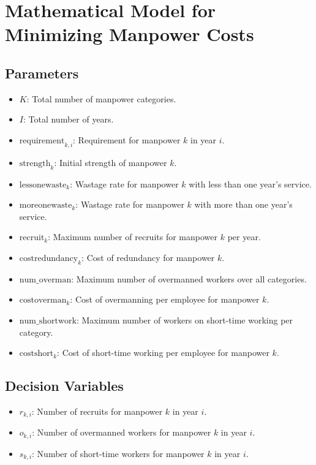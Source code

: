 \documentclass{article}
\begin{document}
\section*{Mathematical Model for Minimizing Manpower Costs}

\subsection*{Parameters}
\begin{itemize}
    \item $K$: Total number of manpower categories.
    \item $I$: Total number of years.
    \item $\text{requirement}_{k, i}$: Requirement for manpower $k$ in year $i$.
    \item $\text{strength}_{k}$: Initial strength of manpower $k$.
    \item $\text{lessonewaste}_{k}$: Wastage rate for manpower $k$ with less than one year's service.
    \item $\text{moreonewaste}_{k}$: Wastage rate for manpower $k$ with more than one year's service.
    \item $\text{recruit}_{k}$: Maximum number of recruits for manpower $k$ per year.
    \item $\text{costredundancy}_{k}$: Cost of redundancy for manpower $k$.
    \item $\text{num\_overman}$: Maximum number of overmanned workers over all categories.
    \item $\text{costoverman}_{k}$: Cost of overmanning per employee for manpower $k$.
    \item $\text{num\_shortwork}$: Maximum number of workers on short-time working per category.
    \item $\text{costshort}_{k}$: Cost of short-time working per employee for manpower $k$.
\end{itemize}

\subsection*{Decision Variables}
\begin{itemize}
    \item $r_{k, i}$: Number of recruits for manpower $k$ in year $i$.
    \item $o_{k, i}$: Number of overmanned workers for manpower $k$ in year $i$.
    \item $s_{k, i}$: Number of short-time workers for manpower $k$ in year $i$.
\end{itemize}
\end{document}
